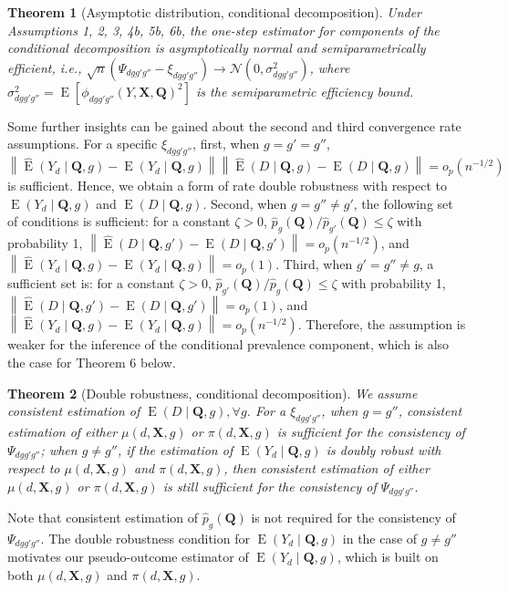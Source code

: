\documentclass[12pt,a4paper]{article}
\newtheorem{prop}{Theorem}
\newcommand{\E}{\operatorname{E}}
\def\X{{\boldsymbol X}}
\def\Q{{\boldsymbol Q}}
\begin{document}
\begin{prop}[Asymptotic distribution, conditional decomposition]
Under Assumptions 1, 2, 3, 4b, 5b, 6b, the one-step estimator for components of the conditional decomposition is asymptotically normal and semiparametrically efficient, i.e., $\sqrt{n} \left( \Psi_{dgg'g''} - \xi_{dgg'g''} \right) \xrightarrow{} \mathcal{N}(0, \sigma^2_{dgg'g''})$, where $\sigma^2_{dgg'g''}=\E \left[\phi_{dgg'g''}(Y,\X,\Q)^2 \right]$ is the semiparametric efficiency bound.
\end{prop}
Some further insights can be gained about the second and third convergence rate assumptions. For a specific $\xi_{dgg'g''}$, first, when $g=g'=g''$, $\left\| \hat{\E}\left( Y_d \mid \Q, g \right) - \E(Y_d \mid \Q,g)  \right\| \left\| \hat{\E}(D \mid \Q, g) - \E(D \mid \Q, g)  \right\| = o_p(n^{-1/2})$ is sufficient. Hence, we obtain a form of rate double robustness with respect to $\E(Y_d \mid \Q,g)$ and $\E(D \mid \Q, g)$. Second, when $g= g'' \neq g'$, the following set of conditions is sufficient: for a constant $\zeta>0$, $\hat{p}_g(\Q)/\hat{p}_{g'}(\Q) \leq \zeta$ with probability 1, $\left\| \hat{\E}(D \mid \Q, g') - \E(D \mid \Q, g') \right\|=o_p(n^{-1/2})$, and $ \left\| \hat{\E}\left( Y_d \mid \Q, g \right) - \E(Y_d \mid \Q,g) \right\|=o_p(1)$. Third, when $g'=g'' \neq g$, a sufficient set is: for a constant $\zeta>0$, $ \hat{p}_{g'}(\Q)/\hat{p}_{g}(\Q) \leq \zeta$ with probability 1, $\left\| \hat{\E}(D \mid \Q, g') - \E(D \mid \Q, g') \right\|=o_p(1)$, and $\left\| \hat{\E}\left( Y_d \mid \Q, g \right) - \E(Y_d \mid \Q,g)  \right\|=o_p(n^{-1/2})$. Therefore, the assumption is weaker for the inference of the conditional prevalence component, which is also the case for Theorem 6 below.

\begin{prop}[Double robustness, conditional decomposition]
We assume consistent estimation of $\E(D \mid \Q, g), \forall g$. For a $\xi_{dgg'g''}$, when $g=g''$, consistent estimation of either $\mu(d,\X,g)$ or $\pi(d,\X,g)$ is sufficient for the consistency of $\Psi_{dgg'g''}$; when $g \neq g''$, if the estimation of $\E(Y_d \mid \Q,g)$ is doubly robust with respect to $\mu(d,\X,g)$ and $\pi(d,\X,g)$, then consistent estimation of either $\mu(d,\X,g)$ or $\pi(d,\X,g)$ is still sufficient for the consistency of $\Psi_{dgg'g''}$.
\end{prop}
Note that consistent estimation of $\hat{p}_g(\Q)$ is not required for the consistency of $\Psi_{dgg'g''}$. The double robustness condition for $\E(Y_d \mid \Q,g)$ in the case of $g \neq g''$ motivates our pseudo-outcome estimator of $\E(Y_d \mid \Q,g)$, which is built on both $\mu(d,\X,g)$ and $\pi(d,\X,g)$.
\end{document}
